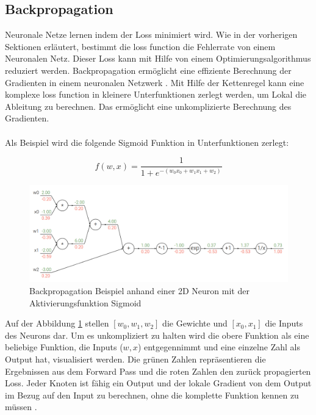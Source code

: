 \subsection{Backpropagation}\label{subsection:backpropagation}
Neuronale Netze lernen indem der Loss minimiert wird. Wie in der vorherigen Sektionen erläutert, bestimmt die \gls{loss function}
die Fehlerrate von einem Neuronalen Netz. Dieser Loss kann mit Hilfe von einem Optimierungsalgorithmus reduziert werden. 
Backpropagation ermöglicht eine effiziente Berechnung der Gradienten in einem neuronalen Netzwerk \cite{was-ist-backpropagation}. 
Mit Hilfe der Kettenregel kann eine komplexe \gls{loss function} in kleinere Unterfunktionen zerlegt werden, um Lokal die Ableitung zu berechnen.
Das ermöglicht eine unkomplizierte Berechnung des Gradienten.
\\
\\
Als Beispiel wird die folgende Sigmoid Funktion in Unterfunktionen zerlegt:

\begin{equation}
  f(w,x) = \frac{1}{1+e^{-(w_0 x_0 + w_1 x_1 + w_2)}}
\end{equation}

\begin{figure}[H]
  \centering
  \includegraphics[width=1\textwidth]{resources/cnn/backpropagation.png}
  \caption{
    Backpropagation Beispiel anhand einer 2D Neuron mit der Aktivierungsfunktion Sigmoid
    \cite{backpropagation}
  }
  \label{image:backpropagation}
\end{figure}

Auf der Abbildung \ref{image:backpropagation} stellen $ [w_0, w_1, w_2] $ die Gewichte und $ [x_0, x_1] $ die Inputs des Neurons dar. 
Um es unkompliziert zu halten wird die 
obere Funktion als eine beliebige Funktion, die Inputs ($w, x$) entgegennimmt und eine einzelne Zahl als Output hat, visualisiert werden. 
Die grünen Zahlen repräsentieren die Ergebnissen aus dem Forward Pass und die roten Zahlen den zurück propagierten Loss. Jeder Knoten ist fähig 
ein Output und der lokale Gradient von dem Output im Bezug auf den Input zu berechnen, ohne die komplette Funktion kennen zu müssen \cite{cs231-backpropagation}.

